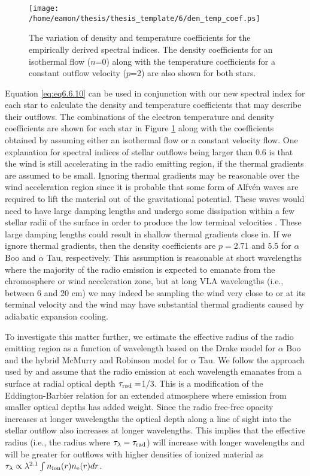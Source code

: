 \begin{figure}[hbt!]
\centering 
          \texttt{[image: /home/eamon/thesis/thesis\_template/6/den\_temp\_coef.ps]}
\caption[Variation of density and temperature coefficients for $\alpha$ Boo and $\alpha$ Tau.]{The variation of density and temperature coefficients for the empirically derived spectral indices. The density coefficients for an isothermal flow ($n$=0) along with the temperature coefficients for a constant outflow velocity ($p$=2) are also shown for both stars.}
\label{fig6.6.2}
\end{figure}

Equation \ref{eq:eq6.6.10} can be used in conjunction with our new spectral index for each star to calculate the density and temperature coefficients that may describe their outflows. The combinations of the electron temperature and density coefficients are shown for each star in Figure \ref{fig6.6.2} along with the coefficients obtained by assuming either an isothermal flow or a constant velocity flow. One explanation for spectral indices of stellar outflows being larger than 0.6 is that the wind is still accelerating in the radio emitting region, if the thermal gradients are assumed to be small. Ignoring thermal gradients may be reasonable over the wind acceleration region since it is probable that some form of Alfv\'en waves are required to lift the material out of the gravitational potential. These waves would need to have large damping lengths and undergo some dissipation within a few stellar radii of the surface in order to produce the low terminal velocities \citep{hartmann_1980}. These large damping lengths could result in shallow thermal gradients close in. If we ignore thermal gradients, then the density coefficients are $p=$2.71 and 5.5 for $\alpha$ Boo  and $\alpha$ Tau, respectively. This assumption is reasonable at short wavelengths where the majority of the radio emission is expected to emanate from the chromosphere or wind acceleration zone, but at long VLA wavelengths (i.e., between 6 and 20 cm) we may indeed be sampling the wind very close to or at its terminal velocity and the wind may have substantial thermal gradients caused by adiabatic expansion cooling. 

To investigate this matter further,  we estimate the effective radius of the radio emitting region as a function of wavelength based on the Drake model for $\alpha$ Boo and the hybrid McMurry and Robinson model for $\alpha$ Tau. We follow the approach used by \cite{cassinelli_1977} and assume that the radio emission at each wavelength emanates from a surface at radial optical depth $\tau _{\rm{rad}}=$1/3. This is a modification of the Eddington-Barbier relation for an extended atmosphere where emission from smaller optical depths has added weight. Since the radio free-free opacity increases at longer wavelengths the optical depth along a line of sight into the stellar outflow also increases at longer wavelengths. This implies that the effective radius (i.e., the radius where $\tau _{\lambda} = \tau _{\rm{rad}}$) will increase with longer wavelengths and will be greater for outflows with higher densities of ionized material as $\tau _{\lambda} \propto \lambda ^{2.1}\int n_{\rm{ion}}(r)n_{\rm{e}}(r) dr$. 

